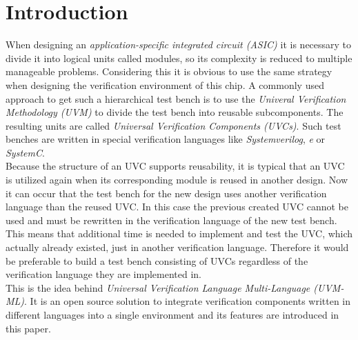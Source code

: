 \section{Introduction}\label{introduction}
When designing an \emph{application-specific integrated circuit (ASIC)} it is
necessary to divide it into logical units called modules, so its complexity is
reduced to multiple manageable problems. Considering this it is obvious to use the same
strategy when designing the verification environment of this chip. A commonly
used approach to get such a hierarchical test bench is to use the \emph{Univeral
Verification Methodology (UVM)} to divide the test bench into reusable
subcomponents. The resulting units are called \emph{Universal Verification
Components (UVCs)}. Such test benches are written in special verification
languages like \emph{Systemverilog}, \emph{e} or \emph{SystemC}.\\
Because the structure of an UVC supports reusability, it is typical that an UVC
is utilized again when its corresponding module is reused in another design. Now
it can occur that the test bench for the new design uses another verification
language than the reused UVC. In this case the previous created UVC cannot be
used and must be rewritten in the verification language of the new test bench.
This means that additional time is needed to implement and test the UVC, which
actually already existed, just in another verification language. Therefore it
would be preferable to build a test bench consisting of UVCs regardless of the
verification language they are implemented in.\\
This is the idea behind  \emph{Universal Verification Language
Multi-Language (UVM-ML)}. It is an open source solution to integrate
verification components written in different languages into a single
environment and its features are introduced in this paper.




